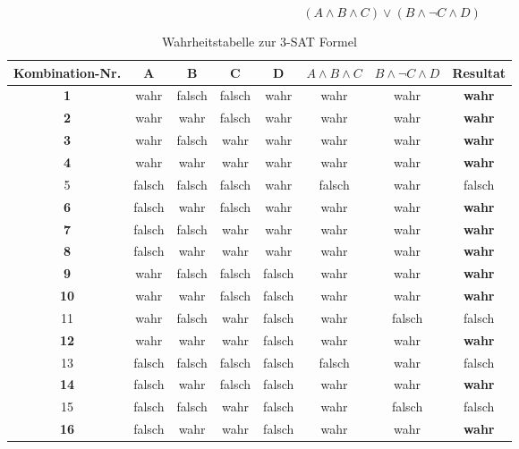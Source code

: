 	\begin{equation}
   		(A \wedge B \wedge C) \vee (B \wedge \neg C \wedge D)
  		 \label{eq:aussagenlogik_3sat}
	\end{equation}

\begin{table}[ht]
\centering
  \begin{tabular}{ c | c | c | c | c | c | c | c}
	\hline
	\rowcolor{gray}
	\textbf{Kombination-Nr.}	& \textbf{A}	& \textbf{B} 	& \textbf{C} & \textbf{D}  & $A \wedge B \wedge C$ & $B \wedge \neg C \wedge D$	& \textbf{Resultat}\\ \hline
	\textbf{1}			& wahr	& falsch	& falsch	& wahr	& wahr			 & wahr				& \textbf{wahr}\\ \hline
	\textbf{2}			& wahr	& wahr	& falsch	& wahr	& wahr			 & wahr 				& \textbf{wahr}\\ \hline
	\textbf{3}			& wahr	& falsch	& wahr	& wahr	& wahr			 & wahr				& \textbf{wahr}\\ \hline
	\textbf{4}			& wahr	& wahr	& wahr	& wahr	& wahr			 & wahr				& \textbf{wahr}\\ \hline
	5				& falsch	& falsch	& falsch	& wahr	& falsch			 & wahr				& falsch\\ \hline
	\textbf{6}			& falsch	& wahr	& falsch	& wahr	& wahr			 & wahr				& \textbf{wahr}\\ \hline
	\textbf{7}			& falsch	& falsch	& wahr	& wahr	& wahr			 & wahr 				& \textbf{wahr}\\ \hline
	\textbf{8}			& falsch	& wahr	& wahr	& wahr	& wahr			 & wahr 				& \textbf{wahr}\\ \hline
	\textbf{9}			& wahr	& falsch	& falsch	& falsch	& wahr			 & wahr				& \textbf{wahr}\\ \hline
	\textbf{10}			& wahr	& wahr	& falsch	& falsch	& wahr			 & wahr 				& \textbf{wahr}\\ \hline
	11				& wahr	& falsch	& wahr	& falsch	& wahr			 & falsch				& falsch\\ \hline
	\textbf{12}			& wahr	& wahr	& wahr	& falsch	& wahr			 & wahr				& \textbf{wahr}\\ \hline
	13				& falsch	& falsch	& falsch	& falsch	& falsch			 & wahr				& falsch\\ \hline
	\textbf{14}			& falsch	& wahr	& falsch	& falsch	& wahr			 & wahr				& \textbf{wahr}\\ \hline
	15				& falsch	& falsch	& wahr	& falsch	& wahr			 & falsch 				& falsch\\ \hline
	\textbf{16}			& falsch	& wahr	& wahr	& falsch	& wahr			 & wahr 				& \textbf{wahr}\\ \hline
  \end{tabular}
   \caption{Wahrheitstabelle zur 3-SAT Formel}\label{table:3sat_results}
\end{table}




